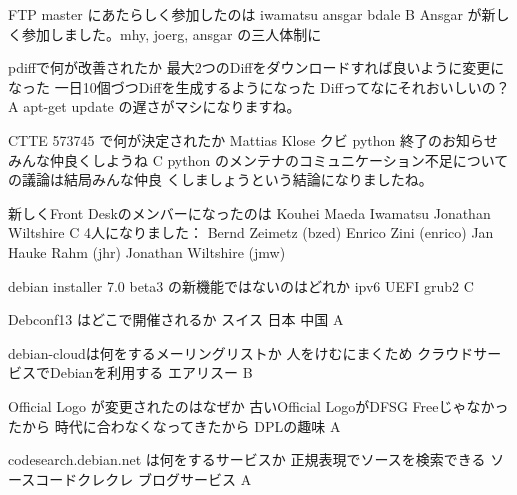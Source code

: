 %

\santaku
{FTP master にあたらしく参加したのは}
{iwamatsu}
{ansgar}
{bdale}
{B}
{Ansgar が新しく参加しました。mhy, joerg, ansgar の三人体制に}

\santaku
{pdiffで何が改善されたか}
{最大2つのDiffをダウンロードすれば良いように変更になった}
{一日10個づつDiffを生成するようになった}
{Diffってなにそれおいしいの？}
{A}
{apt-get update の遅さがマシになりますね。}

\santaku
{CTTE 573745 で何が決定されたか}
{Mattias Klose クビ}
{python 終了のお知らせ}
{みんな仲良くしようね}
{C}
{python のメンテナのコミュニケーション不足についての議論は結局みんな仲良
くしましょうという結論になりましたね。}

\santaku
{新しくFront Deskのメンバーになったのは}
{Kouhei Maeda}
{Iwamatsu}
{Jonathan Wiltshire}
{C}
{4人になりました：
 Bernd Zeimetz      (bzed)
 Enrico Zini        (enrico)
 Jan Hauke Rahm     (jhr)
 Jonathan Wiltshire (jmw)
}

\santaku
{debian installer 7.0 beta3 の新機能ではないのはどれか}
{ipv6}
{UEFI}
{grub2}
{C}
{}

\santaku
{Debconf13 はどこで開催されるか}
{スイス}
{日本}
{中国}
{A}
{}

\santaku
{debian-cloudは何をするメーリングリストか}
{人をけむにまくため}
{クラウドサービスでDebianを利用する}
{エアリスー}
{B}
{}

\santaku
{Official Logo が変更されたのはなぜか}
{古いOfficial LogoがDFSG Freeじゃなかったから}
{時代に合わなくなってきたから}
{DPLの趣味}
{A}
{}

\santaku
{codesearch.debian.net は何をするサービスか}
{正規表現でソースを検索できる}
{ソースコードクレクレ}
{ブログサービス}
{A}
{}
